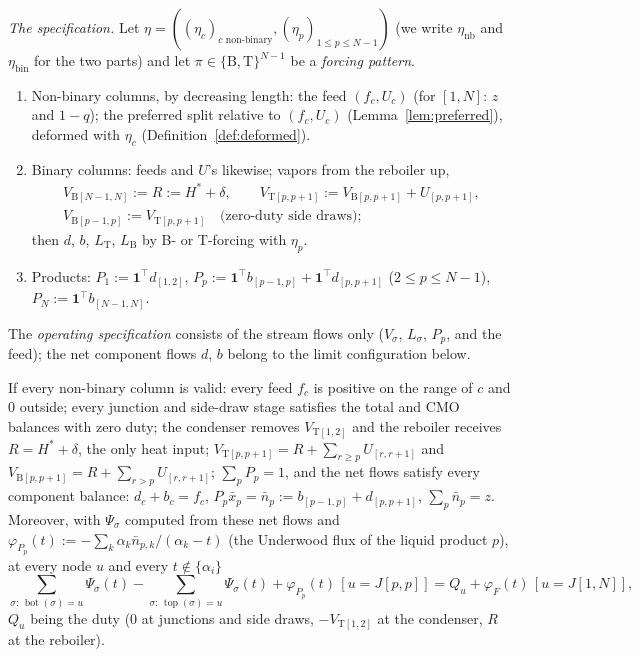 \documentclass[11pt,a4paper]{report}
\newcommand{\cF}{\mathcal F}
\newcommand{\one}{\mathbf 1}
\newcommand{\Hs}{H^{*}}
\newcommand{\Ts}{\mathrm T}
\newcommand{\Bs}{\mathrm B}
\newcommand{\bott}{\operatorname{bot}}
\newcommand{\topp}{\operatorname{top}}
\begin{document}
\emph{The specification.} Let \(\eta=((\eta_c)_{c\text{ non-binary}},(\eta_p)_{1\le p\le N-1})\) (we write \(\eta_{\mathrm{nb}}\) and
\(\eta_{\mathrm{bin}}\) for the two parts) and let \(\pi\in\{\Bs,\Ts\}^{N-1}\) be a \emph{forcing pattern}.

\begin{definition}[the forced specification \(\cF(\delta,\eta,\pi)\)]\label{def:F}\leavevmode
\begin{enumerate}[(F1)]
\item Non-binary columns, by decreasing length: the feed \((f_c,U_c)\) (for \([1,N]\): \(z\) and \(1-q\)); the preferred split
relative to \((f_c,U_c)\) (Lemma~\ref{lem:preferred}), deformed with \(\eta_c\) (Definition~\ref{def:deformed}).
\item Binary columns: feeds and \(U\)'s likewise; vapors from the reboiler up,
\begin{gather*}
V_{\Bs[N-1,N]}:=R:=\Hs+\delta,\qquad V_{\Ts[p,p+1]}:=V_{\Bs[p,p+1]}+U_{[p,p+1]},\\
V_{\Bs[p-1,p]}:=V_{\Ts[p,p+1]}\quad\text{(zero-duty side draws)};
\end{gather*}
then \(d\), \(b\), \(L_\Ts\), \(L_\Bs\) by B- or T-forcing with \(\eta_p\).
\item Products: \(P_1:=\one^\top d_{[1,2]}\), \(P_p:=\one^\top b_{[p-1,p]}+\one^\top d_{[p,p+1]}\) (\(2\le p\le N-1\)),
\(P_N:=\one^\top b_{[N-1,N]}\).
\end{enumerate}
The \emph{operating specification} consists of the stream flows only (\(V_\sigma\), \(L_\sigma\), \(P_p\), and the feed); the net component
flows \(d\), \(b\) belong to the limit configuration below.
\end{definition}

\begin{lemma}\label{lem:balances}
If every non-binary column is valid: every feed \(f_c\) is positive on the range of \(c\) and \(0\) outside; every junction and
side-draw stage satisfies the total and CMO balances with zero duty; the condenser removes \(V_{\Ts[1,2]}\) and the reboiler
receives \(R=\Hs+\delta\), the only heat input; \(V_{\Ts[p,p+1]}=R+\sum_{r\ge p}U_{[r,r+1]}\) and
\(V_{\Bs[p,p+1]}=R+\sum_{r>p}U_{[r,r+1]}\); \(\sum_pP_p=1\), and the net flows satisfy every component balance:
\(d_c+b_c=f_c\), \(P_p\bar x_p=\bar n_p:=b_{[p-1,p]}+d_{[p,p+1]}\), \(\sum_p\bar n_p=z\). Moreover, with \(\Psi_\sigma\) computed from these net
flows and \(\varphi_{P_p}(t):=-\sum_k\alpha_k\bar n_{p,k}/(\alpha_k-t)\) (the Underwood flux of the liquid product \(p\)), at every node
\(u\) and every \(t\notin\{\alpha_i\}\)
\begin{equation}\label{eq:bookkeeping}
\sum_{\sigma:\,\bott(\sigma)=u}\Psi_\sigma(t)-\sum_{\sigma:\,\topp(\sigma)=u}\Psi_\sigma(t)+\varphi_{P_p}(t)\,[u=J[p,p]]
=Q_u+\varphi_F(t)\,[u=J[1,N]],
\end{equation}
\(Q_u\) being the duty (\(0\) at junctions and side draws, \(-V_{\Ts[1,2]}\) at the condenser, \(R\) at the reboiler).
\end{lemma}
\end{document}
